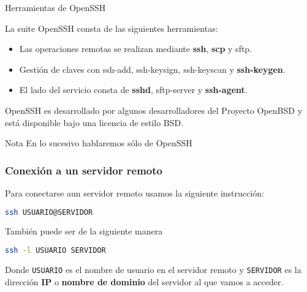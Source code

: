 \begin{frame}[c]{Herramientas de OpenSSH}

  La suite OpenSSH consta de las siguientes herramientas:

  \begin{itemize}
    \item Las operaciones remotas se realizan mediante \textbf{ssh},
      \textbf{scp} y sftp.
    \pausa
    \item Gestión de claves con ssh-add, ssh-keysign, ssh-keyscan
      y \textbf{ssh-keygen}.
    \pausa
    \item El lado del servicio consta de \textbf{sshd}, sftp-server
      y \textbf{ssh-agent}.
  \end{itemize}

  \pausa
  \vspace{\baselineskip}
  OpenSSH es desarrollado por algunos desarrolladores del Proyecto OpenBSD
  y está disponible bajo una licencia de estilo BSD. 

  \vspace{\baselineskip}
  \begin{exampleblock}{Nota}
    En lo sucesivo hablaremos sólo de OpenSSH
  \end{exampleblock}
\end{frame}

\begin{frame}[fragile]
  \frametitle{Conexión a un servidor remoto}

  Para conectarse aun servidor remoto usamos la siguiente instrucción:

  \vspace{\baselineskip}
  \begin{lstlisting}[language=Bash]
ssh USUARIO@SERVIDOR
  \end{lstlisting}

  \pause
  \vspace{\baselineskip}
  También puede ser de la siguiente manera

  \vspace{\baselineskip}
  \begin{lstlisting}[language=Bash]
ssh -l USUARIO SERVIDOR
  \end{lstlisting}

  \vspace{\baselineskip}
  Donde \texttt{USUARIO} es el nombre de usuario en el servidor remoto y
  \texttt{SERVIDOR} es la dirección \textbf{IP} o \textbf{nombre de dominio}
  del servidor al que vamos a acceder.
\end{frame}

